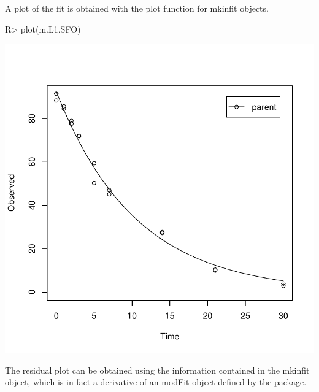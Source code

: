 \documentclass[12pt,a4paper]{article}
\begin{document}
A plot of the fit is obtained with the plot function for mkinfit objects.

\begin{Schunk}
\begin{Sinput}
R> plot(m.L1.SFO)
\end{Sinput}
\end{Schunk}
\includegraphics{examples-L1_SFO_plot}

The residual plot can be obtained using the information contained in the
mkinfit object, which is in fact a derivative of an modFit object defined by
the  package.
\end{document}
